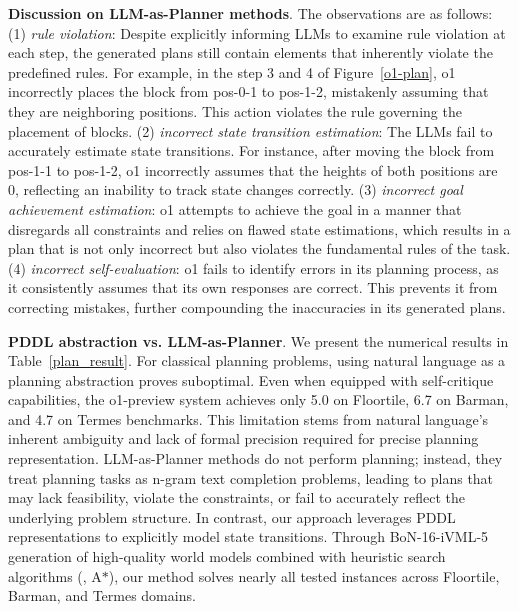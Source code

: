 \vspace{1mm}
\noindent\textbf{Discussion on LLM-as-Planner methods}.
The observations are as follows:
(1) \emph{rule violation}: Despite explicitly informing LLMs to examine rule violation at each step, the generated plans still contain elements that inherently violate the predefined rules. For example, in the step 3 and 4 of Figure~\ref{o1-plan}, o1 incorrectly places the block from pos-0-1 to pos-1-2, mistakenly assuming that they are neighboring positions. This action violates the rule governing the placement of blocks.
(2) \emph{incorrect state transition estimation}: The LLMs fail to accurately estimate state transitions. 
For instance, after moving the block from pos-1-1 to pos-1-2, o1 incorrectly assumes that the heights of both positions are 0, reflecting an inability to track state changes correctly.
(3) \emph{incorrect goal achievement estimation}: o1 attempts to achieve the goal in a manner that disregards all constraints and relies on flawed state estimations, which results in a plan that is not only incorrect but also violates the fundamental rules of the task.
(4) \emph{incorrect self-evaluation}: o1 fails to identify errors in its planning process, as it consistently assumes that its own responses are correct. This prevents it from correcting mistakes, further compounding the inaccuracies in its generated plans.

\vspace{1mm}
\noindent\textbf{PDDL abstraction vs. LLM-as-Planner}.
We present the numerical results in Table~\ref{plan_result}.
For classical planning problems, using natural language as a planning abstraction proves suboptimal. 
Even when equipped with self-critique capabilities, the o1-preview system achieves only 5.0 on Floortile, 6.7 on Barman, and 4.7 on Termes benchmarks. 
This limitation stems from natural language's inherent ambiguity and lack of formal precision required for precise planning representation.
LLM-as-Planner methods do not perform planning; instead, they treat planning tasks as n-gram text completion problems, leading to plans that may lack feasibility, violate the constraints, or fail to accurately reflect the underlying problem structure. 
In contrast, our approach leverages PDDL representations to explicitly model state transitions. 
Through BoN-16-iVML-5 generation of high-quality world models combined with heuristic search algorithms (\ie, A$\ast$), our method solves nearly all tested instances across Floortile, Barman, and Termes domains.






